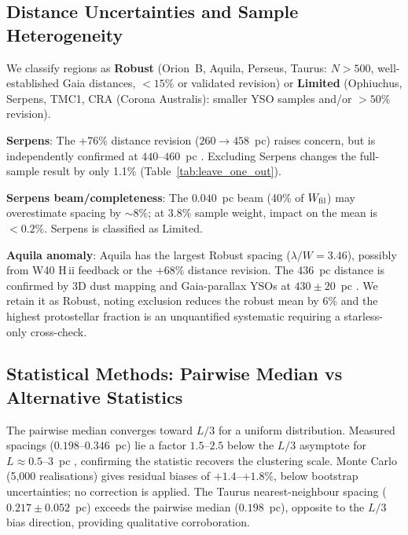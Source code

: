 \documentclass[twoside,twocolumn]{mnras}
\begin{document}
\subsection{Distance Uncertainties and Sample Heterogeneity}
\label{sec:distance_uncertainties}

We classify regions as \textbf{Robust} (Orion~B, Aquila, Perseus, Taurus: $N>500$,
well-established Gaia distances, $<15\%$ or validated revision) or \textbf{Limited}
(Ophiuchus, Serpens, TMC1, CRA (Corona Australis): smaller YSO samples and/or $>50\%$ revision).

\textbf{Serpens}: The +76\% distance revision ($260 \to 458$~pc) raises concern, but is independently confirmed at $440$--$460$~pc \citep{Yan2022, Green2024, Zucker2020}. Excluding Serpens changes the full-sample result by only 1.1\% (Table~\ref{tab:leave_one_out}).

\textbf{Serpens beam/completeness}: The $0.040$~pc beam (40\% of $W_{\rm fil}$) may
overestimate spacing by ${\sim}8\%$; at 3.8\% sample weight, impact on the mean is
$<0.2\%$. Serpens is classified as Limited.

\textbf{Aquila anomaly}: Aquila has the largest Robust spacing ($\lambda/W = 3.46$),
possibly from W40 H\,{\sc ii} feedback \citep{Bontemps2010} or the $+68\%$ distance
revision. The 436~pc distance is confirmed by 3D dust mapping \citep{Zucker2020} and
Gaia-parallax YSOs at $430 \pm 20$~pc \citep{Konyves2020}. We retain it as Robust,
noting exclusion reduces the robust mean by 6\% and the highest protostellar fraction
is an unquantified systematic requiring a starless-only cross-check.

\subsection{Statistical Methods: Pairwise Median vs Alternative Statistics}
\label{sec:statistics}

The pairwise median converges toward $L/3$ for a uniform distribution. Measured spacings
($0.198$--$0.346$~pc) lie a factor $1.5$--$2.5$ below the $L/3$ asymptote for
$L \approx 0.5$--$3$~pc \citep{Arzoumanian2019}, confirming the statistic recovers the
clustering scale. Monte Carlo (5,000 realisations) gives residual biases of $+1.4$--$+1.8\%$,
below bootstrap uncertainties; no correction is applied. The Taurus nearest-neighbour
spacing ($0.217 \pm 0.052$~pc) exceeds the pairwise median ($0.198$~pc), opposite to
the $L/3$ bias direction, providing qualitative corroboration.
\end{document}
